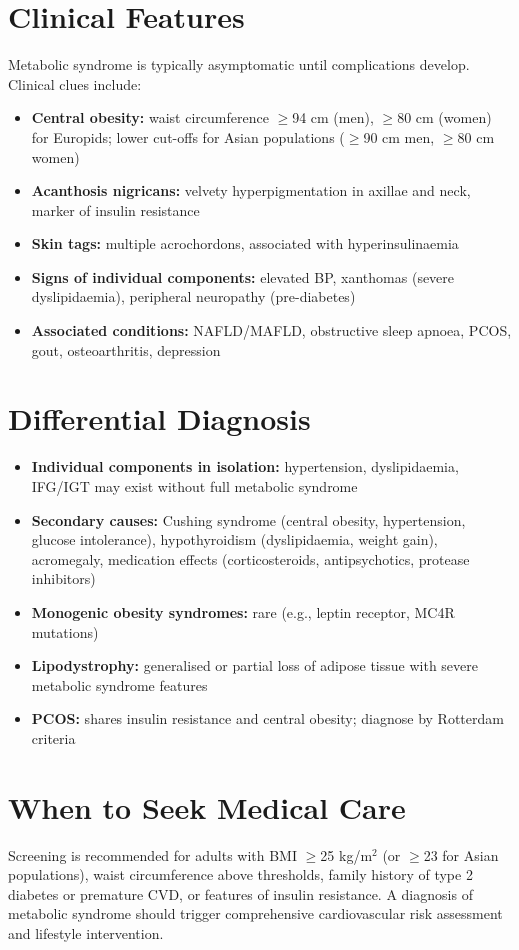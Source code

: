 \section*{Clinical Features}
Metabolic syndrome is typically asymptomatic until complications develop. Clinical clues include:
\begin{itemize}
    \item \textbf{Central obesity:} waist circumference $\ge$94 cm (men), $\ge$80 cm (women) for Europids; lower cut-offs for Asian populations ($\ge$90 cm men, $\ge$80 cm women)
    \item \textbf{Acanthosis nigricans:} velvety hyperpigmentation in axillae and neck, marker of insulin resistance
    \item \textbf{Skin tags:} multiple acrochordons, associated with hyperinsulinaemia
    \item \textbf{Signs of individual components:} elevated BP, xanthomas (severe dyslipidaemia), peripheral neuropathy (pre-diabetes)
    \item \textbf{Associated conditions:} NAFLD/MAFLD, obstructive sleep apnoea, PCOS, gout, osteoarthritis, depression
\end{itemize}

\section*{Differential Diagnosis}
\begin{itemize}
    \item \textbf{Individual components in isolation:} hypertension, dyslipidaemia, IFG/IGT may exist without full metabolic syndrome
    \item \textbf{Secondary causes:} Cushing syndrome (central obesity, hypertension, glucose intolerance), hypothyroidism (dyslipidaemia, weight gain), acromegaly, medication effects (corticosteroids, antipsychotics, protease inhibitors)
    \item \textbf{Monogenic obesity syndromes:} rare (e.g., leptin receptor, MC4R mutations)
    \item \textbf{Lipodystrophy:} generalised or partial loss of adipose tissue with severe metabolic syndrome features
    \item \textbf{PCOS:} shares insulin resistance and central obesity; diagnose by Rotterdam criteria
\end{itemize}

\section*{When to Seek Medical Care}
Screening is recommended for adults with BMI $\ge$25 kg/m$^2$ (or $\ge$23 for Asian populations), waist circumference above thresholds, family history of type 2 diabetes or premature CVD, or features of insulin resistance. A diagnosis of metabolic syndrome should trigger comprehensive cardiovascular risk assessment and lifestyle intervention.

